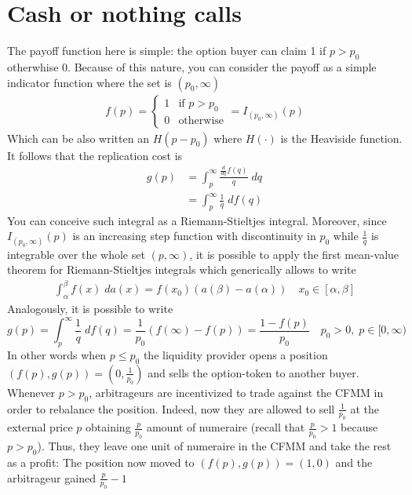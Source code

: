 \documentclass[12pt]{article}
\begin{document}
\section{Cash or nothing calls}
The payoff function here is simple: the option buyer can claim 1 if $p> p_0$ otherwhise 0. Because of this nature, you can consider the payoff as a simple indicator function where the set is $(p_0,\infty)$
\begin{align*}
    f(p) = \begin{cases}
               1 & \text{if } p>p_0 \\
               0 & \text{otherwise}
           \end{cases} = I_{(p_0,\infty)}(p)
\end{align*}
Which can be also written an $H(p-p_0)$ where $H(\cdot)$ is the Heaviside function.\newline
It follows that the replication cost is
\begin{align*}
    g(p) & =\int_{p}^{\infty}\frac{\frac{d}{dq}f(q)}{q}  \; dq \\
         & =\int_{p}^{\infty}\frac{1}{q}  \; df(q)
\end{align*}
You can conceive such integral as a Riemann-Stieltjes integral. Moreover, since $I_{(p_0,\infty)}(p)$ is an increasing step function with discontinuity in $p_0$ while $\frac{1}{q}$ is integrable over the whole set $(p,\infty)$, it is possible to apply the first mean-value theorem for Riemann-Stieltjes integrals which generically allows to write
\begin{align*}
    \int_\alpha^\beta f(x) \; da(x) = f(x_0) (a(\beta)-a(\alpha))\quad x_0\in[\alpha,\beta]
\end{align*}
Analogously, it is possible to write
\begin{equation}
    g(p)=\int_{p}^{\infty}\frac{1}{q}  \; df(q)=\frac{1}{p_0}(f(\infty)-f(p))=\frac{1-f(p)}{p_0} \quad p_0>0, \; p\in[0,\infty) \label{eq:12}
\end{equation}
In other words when $p\leq p_0$ the liquidity provider opens a position $(f(p),g(p))=\left(0,\frac{1}{p_0}\right)$ and sells the option-token to another buyer.
Whenever $p>p_0$, arbitrageurs are incentivized to trade against the CFMM in order to rebalance the position. Indeed, now they are allowed to sell $\frac{1}{p_0}$ at the external price $p$ obtaining $\frac{p}{p_0}$ amount of numeraire (recall that $\frac{p}{p_0}>1 $ because $ p>p_0$). Thus, they leave one unit of numeraire in the CFMM and take the rest as a profit: The position now moved to $(f(p),g(p))=(1,0)$ and the arbitrageur gained $\frac{p}{p_0}-1$ 
\end{document}

